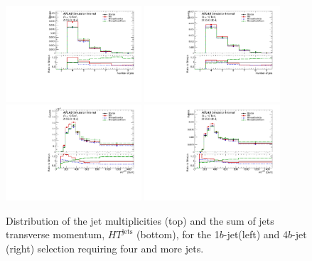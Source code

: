 \begin{figure}[!htb]
\centering
\includegraphics[width=0.45\textwidth]{Plots/ttV/c_Region_0_nJets}
\includegraphics[width=0.45\textwidth]{Plots/ttV/c_Region_1_nJets}\\
\includegraphics[width=0.45\textwidth]{Plots/ttV/c_Region_0_HT_jets}
\includegraphics[width=0.45\textwidth]{Plots/ttV/c_Region_1_HT_jets}\\
  \caption{Distribution of the jet multiplicities (top) and the sum of jets transverse momentum, $HT^{\text{jets}}$ (bottom), for the 1$b$-jet(left) and 4$b$-jet (right) selection requiring four and more jets. \label{ttV:4j12b}}
\end{figure}


